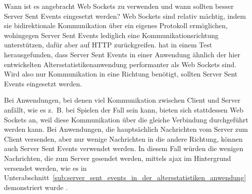 Wann ist es angebracht Web Sockets zu verwenden und wann sollten besser Server Sent Events eingesetzt werden?
Web Sockets sind relativ mächtig, indem sie bidirektionale Kommunikation über ein eigenes Protokoll ermöglichen, wohingegen Server Sent Events lediglich eine Kommunikationsrichtung unterstützen, dafür aber auf HTTP zurückgreifen.
\citealt{ws_vs_sse_performance} hat in einem Test herausgefunden, dass Server Sent Events in einer Anwendung ähnlich der hier entwickelten Altersstatistikenanwendung performanter als Web Sockets sind.
Wird also nur Kommunikation in eine Richtung benötigt, sollten Server Sent Events eingesetzt werden.

Bei Anwendungen, bei denen viel Kommunikation zwischen Client und Server anfällt, wie es z.~B. bei Spielen der Fall sein kann, bieten sich stattdessen Web Sockets an, weil diese Kommunikation über die gleiche Verbindung durchgeführt werden kann.
Bei Anwendungen, die hauptsächlich Nachrichten vom Server zum Client versenden, aber nur wenige Nachrichten in die andere Richtung, können auch Server Sent Events verwendet werden.
In diesem Fall würden die wenigen Nachrichten, die zum Server gesendet werden, mittels \gls{ajax} im Hintergrund versendet werden, wie es in Unterabschnitt~\ref{sub:server_sent_events_in_der_altersstatistiken_anwendung} demonstriert wurde \cite[vgl.][]{ws_vs_sse}.



